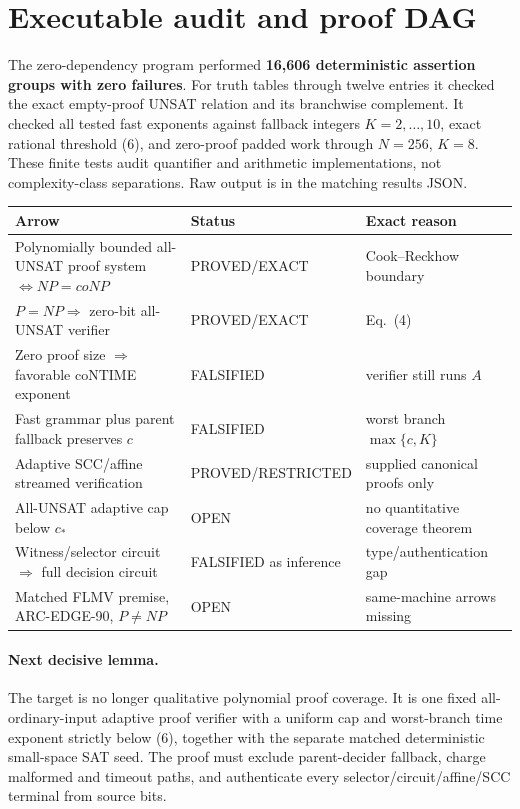 \documentclass[11pt]{article}
\begin{document}
\section{Executable audit and proof DAG}
The zero-dependency program
performed \textbf{16,606 deterministic assertion groups with zero failures}.
For truth tables through twelve entries it checked the exact empty-proof
UNSAT relation and its branchwise complement.  It checked all tested fast
exponents against fallback integers $K=2,\ldots,10$, exact rational threshold
(6), and zero-proof padded work through $N=256$, $K=8$.  These finite tests
audit quantifier and arithmetic implementations, not complexity-class
separations.  Raw output is in the matching results JSON.

\begin{center}\begin{tabular}{p{.43\linewidth}p{.2\linewidth}p{.29\linewidth}}
\toprule Arrow & Status & Exact reason\\\midrule
Polynomially bounded all-UNSAT proof system $\Leftrightarrow NP=coNP$ & PROVED/EXACT & Cook--Reckhow boundary\\
$P=NP\Rightarrow$ zero-bit all-UNSAT verifier & PROVED/EXACT & Eq.~(4)\\
Zero proof size $\Rightarrow$ favorable coNTIME exponent & FALSIFIED & verifier still runs $A$\\
Fast grammar plus parent fallback preserves $c$ & FALSIFIED & worst branch $\max\{c,K\}$\\
Adaptive SCC/affine streamed verification & PROVED/RESTRICTED & supplied canonical proofs only\\
All-UNSAT adaptive cap below $c_*$ & OPEN & no quantitative coverage theorem\\
Witness/selector circuit $\Rightarrow$ full decision circuit & FALSIFIED as inference & type/authentication gap\\
Matched FLMV premise, ARC-EDGE-90, $P\ne NP$ & OPEN & same-machine arrows missing\\
\bottomrule\end{tabular}\end{center}

\paragraph{Next decisive lemma.}
The target is no longer qualitative polynomial proof coverage.  It is one
fixed all-ordinary-input adaptive proof verifier with a uniform cap and
worst-branch time exponent strictly below (6), together with the separate
matched deterministic small-space SAT seed.  The proof must exclude
parent-decider fallback, charge malformed and timeout paths, and authenticate
every selector/circuit/affine/SCC terminal from source bits.
\end{document}
